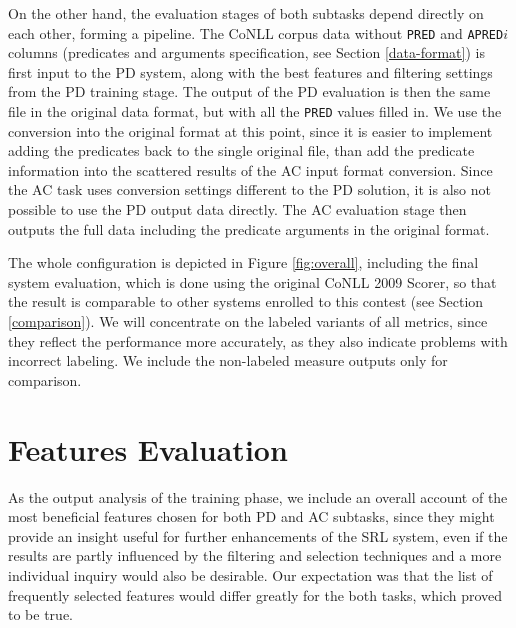 \documentclass[12pt,notitlepage]{report}
\begin{document}
On the other hand, the evaluation stages of both subtasks depend directly on each other, forming a pipeline. The CoNLL corpus data without \texttt{PRED} and \texttt{APRED$i$} columns (predicates and arguments specification, see Section \ref{data-format}) is first input to the PD system, along with the best features and filtering settings from the PD training stage. The output of the PD evaluation is then the same file in the original data format, but with all the \texttt{PRED} values filled in. We use the conversion into the original format at this point, since it is easier to implement adding the predicates back to the single original file, than add the predicate information into the scattered results of the AC input format conversion. Since the AC task uses conversion settings different to the PD solution, it is also not possible to use the PD output data directly. The AC evaluation stage then outputs the full data including the predicate arguments in the original format.

The whole configuration is depicted in Figure \ref{fig:overall}, including the final system evaluation, which is done using the original CoNLL 2009 Scorer, so that the result is comparable to other systems enrolled to this contest (see Section \ref{comparison}). We will concentrate on the labeled variants of all metrics, since they reflect the performance more accurately, as they also indicate problems with incorrect labeling. We include the non-labeled measure outputs only for comparison.

\section{Features Evaluation}\label{selfeats}

As the output analysis of the training phase, we include an overall account of the most beneficial features chosen for both PD and AC subtasks, since they might provide an insight useful for further enhancements of the SRL system, even if the results are partly influenced by the filtering and selection techniques and a more individual inquiry would also be desirable. Our expectation was that the list of frequently selected features would differ greatly for the both tasks, which proved to be true.
\end{document}
